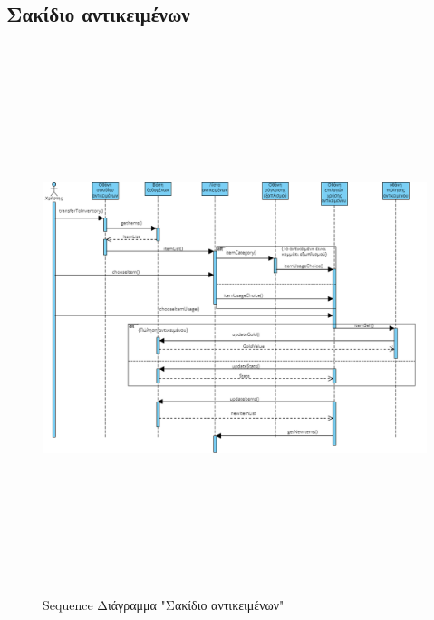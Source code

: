\subsection{Σακίδιο αντικειμένων}
\begin{figure}[!htb]
\begin{center}
    \includegraphics[width=\textwidth,height=16cm]{sequence_items.png}
    \caption{Sequence Διάγραμμα "Σακίδιο αντικειμένων"}
    \label{}
    \end{center}
\end{figure}
\newpage

